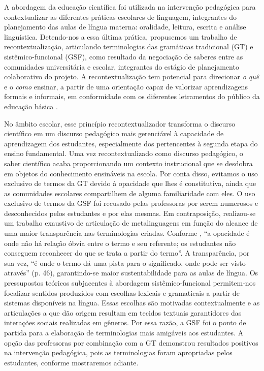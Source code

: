 A abordagem da educação científica foi utilizada na intervenção
pedagógica para contextualizar as diferentes práticas escolares de
linguagem, integrantes do planejamento das aulas de língua materna:
oralidade, leitura, escrita e análise linguística. Detendo-nos a essa
última prática, propusemos um trabalho de recontextualização,
articulando terminologias das gramáticas tradicional (GT) e
sistêmico-funcional (GSF), como resultado da negociação de saberes entre
as comunidades universitária e escolar, integrantes do estágio de
planejamento colaborativo do projeto. A recontextualização tem potencial
para direcionar \emph{o quê} e o \emph{como} ensinar, a partir de uma
orientação capaz de valorizar aprendizagens formais e informais, em
conformidade com os diferentes letramentos do público da educação básica
\cite{bernstein_pedagogy_2000,antonella_recontextualizacao_2023}.

No âmbito escolar, esse princípio recontextualizador transforma o
discurso científico em um discurso pedagógico mais gerenciável à
capacidade de aprendizagem dos estudantes, especialmente dos
pertencentes à segunda etapa do ensino fundamental. Uma vez
recontextualizado como discurso pedagógico, o saber científico acaba
proporcionando um contexto instrucional que se desdobra em objetos do
conhecimento ensináveis na escola. Por conta disso, evitamos o uso
exclusivo de termos da GT devido à opacidade que lhes é constitutiva,
ainda que as comunidades escolares compartilhem de alguma familiaridade
com eles. O uso exclusivo de termos da GSF foi recusado pelas
professoras por serem numerosos e desconhecidos pelos estudantes e por
elas mesmas. Em contraposição, realizou-se um trabalho exaustivo de
articulação de metalinguagens em função do alcance de uma maior
transparência nas terminologias criadas. Conforme \textcite[p. 50]{berry_terminology_2010},
``a opacidade é onde não há relação óbvia entre o termo e seu referente;
os estudantes não conseguem reconhecer do que se trata a partir do
termo''. A transparência, por sua vez, ``é onde o termo dá uma pista
para o significado, onde pode ser \textquotesingle visto
através\textquotesingle'' (p. 46), garantindo-se maior sustentabilidade
para as aulas de língua.
Os pressupostos teóricos subjacentes à abordagem sistêmico-funcional
permitem-nos focalizar sentidos produzidos com escolhas lexicais e
gramaticais a partir de sistemas disponíveis na língua. Essas escolhas
são motivadas contextualmente e as articulações a que dão origem
resultam em tecidos textuais garantidores das interações sociais
realizadas em gêneros. Por essa razão, a GSF foi o ponto de partida para
a elaboração de terminologias mais amigáveis aos estudantes. A opção das
professoras por combinação com a GT demonstrou resultados positivos na
intervenção pedagógica, pois as terminologias foram apropriadas pelos
estudantes, conforme mostraremos adiante.

